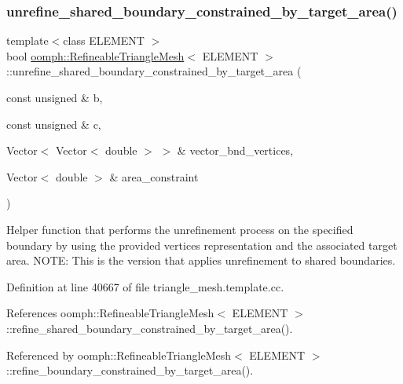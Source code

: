 \subsubsection{\texorpdfstring{unrefine\+\_\+shared\+\_\+boundary\+\_\+constrained\+\_\+by\+\_\+target\+\_\+area()}{unrefine\_shared\_boundary\_constrained\_by\_target\_area()}}
{\footnotesize\ttfamily template$<$class E\+L\+E\+M\+E\+NT $>$ \\
bool \hyperlink{classoomph_1_1RefineableTriangleMesh}{oomph\+::\+Refineable\+Triangle\+Mesh}$<$ E\+L\+E\+M\+E\+NT $>$\+::unrefine\+\_\+shared\+\_\+boundary\+\_\+constrained\+\_\+by\+\_\+target\+\_\+area (\begin{DoxyParamCaption}\item[{const unsigned \&}]{b,  }\item[{const unsigned \&}]{c,  }\item[{Vector$<$ Vector$<$ double $>$ $>$ \&}]{vector\+\_\+bnd\+\_\+vertices,  }\item[{Vector$<$ double $>$ \&}]{area\+\_\+constraint }\end{DoxyParamCaption})\hspace{0.3cm}{\ttfamily [protected]}}



Helper function that performs the unrefinement process on the specified boundary by using the provided vertices representation and the associated target area. N\+O\+TE\+: This is the version that applies unrefinement to shared boundaries. 



Definition at line 40667 of file triangle\+\_\+mesh.\+template.\+cc.



References oomph\+::\+Refineable\+Triangle\+Mesh$<$ E\+L\+E\+M\+E\+N\+T $>$\+::refine\+\_\+shared\+\_\+boundary\+\_\+constrained\+\_\+by\+\_\+target\+\_\+area().



Referenced by oomph\+::\+Refineable\+Triangle\+Mesh$<$ E\+L\+E\+M\+E\+N\+T $>$\+::refine\+\_\+boundary\+\_\+constrained\+\_\+by\+\_\+target\+\_\+area().

\mbox{\label{classoomph_1_1RefineableTriangleMesh_ae52c6aea299625c683522f00a89ff33d}} 
